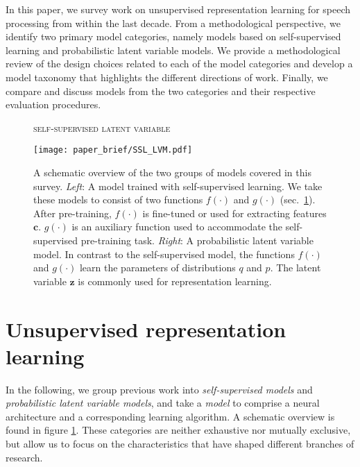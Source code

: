 {In this paper, we survey work on unsupervised representation learning for speech processing from within the last decade.
From a methodological perspective, we identify two primary model categories, namely models based on self-supervised learning and probabilistic latent variable models. 
We provide a methodological review of the design choices related to each of the model categories and develop a model taxonomy that highlights the different directions of work. Finally, we compare and discuss models from the two categories and their respective evaluation procedures.

\begin{figure}[!t]
    \begin{flushleft}
        \textsc{\small \hspace{0.16\textwidth} self-supervised \hspace{0.22\textwidth} latent variable}
    \end{flushleft}
    \centering
    \texttt{[image: paper\_brief/SSL\_LVM.pdf]}
    \caption{A schematic overview of the two groups of models covered in this survey. \textit{Left}: A model trained with self-supervised learning. We take these models to consist of two functions $f(\cdot)$ and $g(\cdot)$ (sec.~\ref{ssec:notation}). After pre-training, $f(\cdot)$ is fine-tuned or used for extracting features $\mathbf{c}$. $g(\cdot)$ is an auxiliary function used to accommodate the self-supervised pre-training task. \textit{Right}: A probabilistic latent variable model. In contrast to the self-supervised model, the functions $f(\cdot)$ and $g(\cdot)$ learn the parameters of distributions $q$ and $p$. The latent variable $\mathbf{z}$ is commonly used for representation learning.}
    \label{fig:ssl_lvm}
\end{figure}

\section{Unsupervised representation learning}\label{ssec:notation}

In the following, we group previous work into \textit{self-supervised models} and \textit{probabilistic latent variable models}, and take a \emph{model} to comprise a neural architecture and a corresponding learning algorithm. A schematic overview is found in figure \ref{fig:ssl_lvm}. These categories are neither exhaustive nor mutually exclusive, but allow us to focus on the characteristics that have shaped different branches of research. 

}
